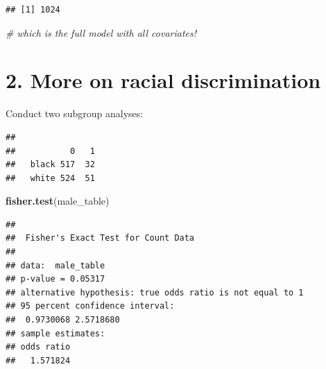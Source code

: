 \documentclass[]{article}
\newenvironment{Shaded}{\begin{snugshade}}{\end{snugshade}}
\newcommand{\KeywordTok}[1]{\textcolor[rgb]{0.13,0.29,0.53}{\textbf{#1}}}
\newcommand{\StringTok}[1]{\textcolor[rgb]{0.31,0.60,0.02}{#1}}
\newcommand{\CommentTok}[1]{\textcolor[rgb]{0.56,0.35,0.01}{\textit{#1}}}
\newcommand{\OperatorTok}[1]{\textcolor[rgb]{0.81,0.36,0.00}{\textbf{#1}}}
\newcommand{\NormalTok}[1]{#1}
\begin{document}
\begin{verbatim}
## [1] 1024
\end{verbatim}

\begin{Shaded}
\begin{Highlighting}[]
\CommentTok{# which is the full model with all covariates!}
\end{Highlighting}
\end{Shaded}

\section*{2. More on racial discrimination}

Conduct two subgroup analyses:

\begin{Shaded}
\end{Shaded}

\begin{verbatim}
##        
##           0   1
##   black 517  32
##   white 524  51
\end{verbatim}

\begin{Shaded}
\begin{Highlighting}[]
\KeywordTok{fisher.test}\NormalTok{(male_table)}
\end{Highlighting}
\end{Shaded}

\begin{verbatim}
## 
##  Fisher's Exact Test for Count Data
## 
## data:  male_table
## p-value = 0.05317
## alternative hypothesis: true odds ratio is not equal to 1
## 95 percent confidence interval:
##  0.9730068 2.5718680
## sample estimates:
## odds ratio 
##   1.571824
\end{verbatim}
\end{document}
